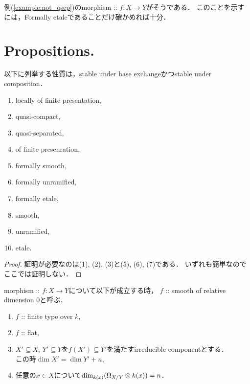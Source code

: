 \documentclass[a4paper, dvipdfmx]{jsarticle}
\begin{document}
\begin{Example}
    例(\ref{example:not_qsep})のmorphism :: $f \colon X \to Y$がそうである．
    このことを示すには，Formally etaleであることだけ確かめれば十分．
\end{Example}

\section{Propositions.}
\begin{Prop} \label{prop:stable_property}
    以下に列挙する性質は，stable under base exchangeかつstable under composition．
    \begin{enumerate}[label=(\arabic*)]
        \item locally of finite presentation,
        \item quasi-compact,
        \item quasi-separated,
        \item of finite presenration,
        \item formally smooth,
        \item formally unramified,
        \item formally etale,
        \item smooth,
        \item unramified,
        \item etale.
    \end{enumerate}    
\end{Prop}
\begin{proof}
    証明が必要なのは(1), (2), (3)と(5), (6), (7)である．
    いずれも簡単なのでここでは証明しない．
\end{proof}

\begin{Def}
    morphism :: $f \colon X \to Y$について以下が成立する時，
    $f$ :: smooth of relative dimension $0$と呼ぶ．
    \begin{enumerate}
        \item $f$ :: finite type over $k$,
        \item $f$ :: flat,
        \item
            $X' \subseteq X$, $Y' \subseteq Y$を$f(X') \subseteq Y'$を満たすirreducible componentとする． \mbox{} \\
            この時$\dim X'=\dim Y'+n$,
        \item 任意の$x \in X$について$\dim_{k(x)} (\Omega_{X/Y} \otimes k(x))=n$．
    \end{enumerate}
\end{Def}
\end{document}
